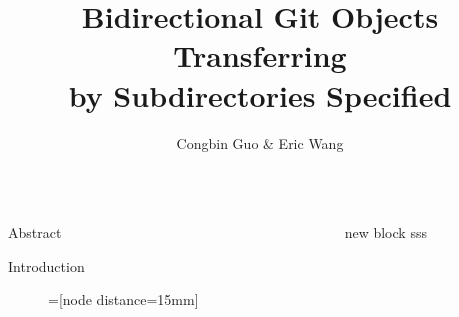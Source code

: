 \documentclass[final]{beamer}
\title{Bidirectional Git Objects Transferring\\by Subdirectories Specified}
\author{Congbin Guo \& Eric Wang}
\institute{VMware Inc.}
\begin{document}
\begin{frame}
  \begin{columns}[t]
    \begin{column}{.5\linewidth}
      \begin{block}{Abstract}
        
      \end{block}
      \begin{block}{Introduction}
        \begin{figure}[htpb]
          =[node distance=15mm]
          \centering
        \end{figure}
      \end{block}
    \end{column}
    \begin{column}{.5\linewidth}
      \begin{block}{new block}
        sss
      \end{block}
    \end{column}
  \end{columns}
\end{frame}
\end{document}

